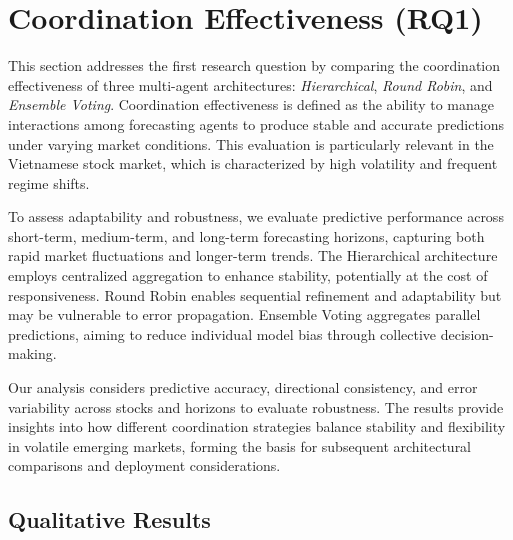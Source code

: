 \documentclass{ieeeaccess}
\begin{document}
\section{Coordination Effectiveness (RQ1)}
This section addresses the first research question by comparing the coordination effectiveness of three multi-agent architectures: \textit{Hierarchical}, \textit{Round Robin}, and \textit{Ensemble Voting}. Coordination effectiveness is defined as the ability to manage interactions among forecasting agents to produce stable and accurate predictions under varying market conditions. This evaluation is particularly relevant in the Vietnamese stock market, which is characterized by high volatility and frequent regime shifts.

To assess adaptability and robustness, we evaluate predictive performance across short-term, medium-term, and long-term forecasting horizons, capturing both rapid market fluctuations and longer-term trends. The Hierarchical architecture employs centralized aggregation to enhance stability, potentially at the cost of responsiveness. Round Robin enables sequential refinement and adaptability but may be vulnerable to error propagation. Ensemble Voting aggregates parallel predictions, aiming to reduce individual model bias through collective decision-making.

Our analysis considers predictive accuracy, directional consistency, and error variability across stocks and horizons to evaluate robustness. The results provide insights into how different coordination strategies balance stability and flexibility in volatile emerging markets, forming the basis for subsequent architectural comparisons and deployment considerations.


\subsection{Qualitative Results}

\clearpage
\onecolumn
\end{document}
